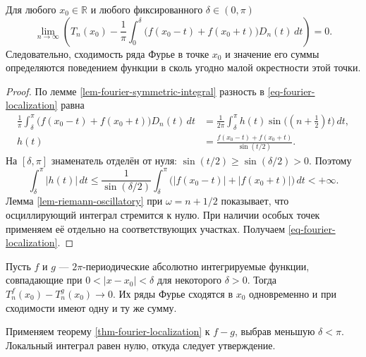 \begin{theorem}\label{thm-fourier-localization}

Для любого \(x_0\in\mathbb R\) и любого фиксированного \(\delta\in(0,\pi)\)
\begin{equation}
\lim_{n\to\infty}\left(
T_n(x_0)-\frac1\pi\int_0^\delta
\bigl(f(x_0-t)+f(x_0+t)\bigr)D_n(t)\,dt
\right)=0.
\label{eq-fourier-localization}
\end{equation}
Следовательно, сходимость ряда Фурье в точке \(x_0\) и значение его суммы определяются поведением функции в сколь угодно малой окрестности этой точки.

\end{theorem}

\begin{proof}

По лемме \ref{lem-fourier-symmetric-integral} разность в \eqref{eq-fourier-localization} равна
\[
\begin{aligned}
\frac1\pi\int_\delta^\pi\bigl(f(x_0-t)+f(x_0+t)\bigr)D_n(t)\,dt
&=\frac1{2\pi}\int_\delta^\pi h(t)\sin\bigl((n+\tfrac12)t\bigr)\,dt,\\
h(t)&=\frac{f(x_0-t)+f(x_0+t)}{\sin(t/2)}.
\end{aligned}
\]
На \([\delta,\pi]\) знаменатель отделён от нуля: \(\sin(t/2)\ge\sin(\delta/2)>0\). Поэтому
\[
\int_\delta^\pi|h(t)|\,dt
\le\frac1{\sin(\delta/2)}\int_\delta^\pi
\bigl(|f(x_0-t)|+|f(x_0+t)|\bigr)\,dt<+\infty.
\]
Лемма \ref{lem-riemann-oscillatory} при \(\omega=n+1/2\) показывает, что осциллирующий интеграл стремится к нулю. При наличии особых точек применяем её отдельно на соответствующих участках. Получаем \eqref{eq-fourier-localization}.

\end{proof}

\begin{cor}\label{cor-fourier-local-agreement}

Пусть \(f\) и \(g\) --- \(2\pi\)-периодические абсолютно интегрируемые функции, совпадающие при \(0<|x-x_0|<\delta\) для некоторого \(\delta>0\). Тогда \(T_n^f(x_0)-T_n^g(x_0)\to0\). Их ряды Фурье сходятся в \(x_0\) одновременно и при сходимости имеют одну и ту же сумму.

\end{cor}

Применяем теорему \ref{thm-fourier-localization} к \(f-g\), выбрав меньшую \(\delta<\pi\). Локальный интеграл равен нулю, откуда следует утверждение.
